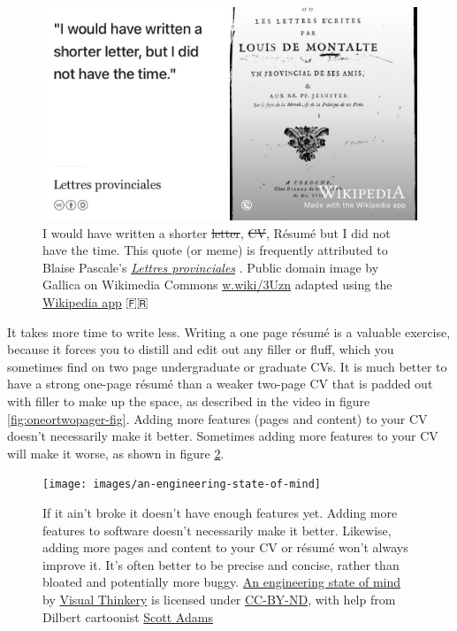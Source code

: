 \documentclass[
]{book}
\begin{document}
\begin{figure}

{\centering \includegraphics[width=0.98\linewidth]{images/shorterletter} 

}

\caption{I would have written a shorter \sout{letter}, \sout{CV}, Résumé but I did not have the time. This quote (or meme) is frequently attributed to Blaise Pascale's \emph{\href{https://en.wikipedia.org/wiki/Lettres_provinciales}{Lettres provinciales}} \citep{shorterletter}. Public domain image by Gallica on Wikimedia Commons \href{https://w.wiki/3Uzn}{w.wiki/3Uzn} adapted using the \href{https://apps.apple.com/us/app/wikipedia/id324715238}{Wikipedia app} 🇫🇷}\label{fig:shorterletter-fig}
\end{figure}



It takes more time to write less. Writing a one page résumé is a valuable exercise, because it forces you to distill and edit out any filler or fluff, which you sometimes find on two page undergraduate or graduate CVs. It is much better to have a strong one-page résumé than a weaker two-page CV that is padded out with filler to make up the space, as described in the video in figure \ref{fig:oneortwopager-fig}. Adding more features (pages and content) to your CV doesn't necessarily make it better. Sometimes adding more features to your CV will make it worse, as shown in figure \ref{fig:morefeatures-fig}.

\begin{figure}

{\centering \texttt{[image: images/an-engineering-state-of-mind]} 

}

\caption{If it ain't broke it doesn't have enough features yet. Adding more features to software doesn't necessarily make it better. Likewise, adding more pages and content to your CV or résumé won't always improve it. It's often better to be precise and concise, rather than bloated and potentially more buggy. \href{https://bryanmmathers.com/an-engineering-state-of-mind/}{An engineering state of mind} by \href{https://visualthinkery.com/}{Visual Thinkery} is licensed under \href{https://creativecommons.org/licenses/by-nd/4.0/}{CC-BY-ND}, with help from Dilbert cartoonist \href{https://en.wikipedia.org/wiki/Scott_Adams}{Scott Adams}}\label{fig:morefeatures-fig}
\end{figure}
\end{document}
